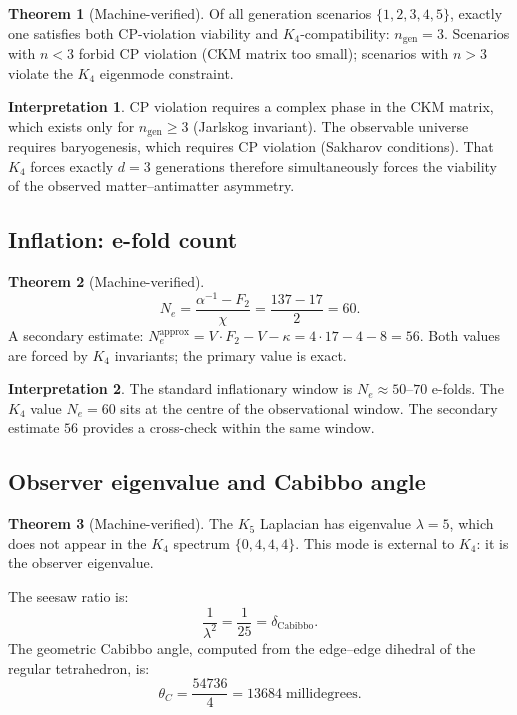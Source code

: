 \documentclass[11pt,a4paper]{article}
\theoremstyle{definition}
\newtheorem{theorem}{Theorem}[section]
\newtheorem*{interpretation}{Interpretation}
\begin{document}
\begin{theorem}[Machine-verified]
Of all generation scenarios $\{1, 2, 3, 4, 5\}$, exactly one satisfies
both CP-violation viability and $K_4$-compatibility: $n_{\mathrm{gen}} = 3$.
Scenarios with $n < 3$ forbid CP violation (CKM matrix too small);
scenarios with $n > 3$ violate the $K_4$ eigenmode constraint.
\end{theorem}

\begin{interpretation}
CP violation requires a complex phase in the CKM matrix, which exists only
for $n_{\mathrm{gen}} \ge 3$ (Jarlskog invariant).  The observable universe
requires baryogenesis, which requires CP violation (Sakharov conditions).
That $K_4$ forces exactly $d = 3$ generations therefore simultaneously
forces the viability of the observed matter--antimatter asymmetry.
\end{interpretation}

\subsection{Inflation: e-fold count}

\begin{theorem}[Machine-verified]
\[
  N_e = \frac{\alpha^{-1} - F_2}{\chi} = \frac{137 - 17}{2} = 60.
\]
A secondary estimate: $N_e^{\mathrm{approx}} = V \cdot F_2 - V - \kappa
= 4 \cdot 17 - 4 - 8 = 56$.
Both values are forced by $K_4$ invariants; the primary value is exact.
\end{theorem}

\begin{interpretation}
The standard inflationary window is $N_e \approx 50$--$70$ e-folds.
The $K_4$ value $N_e = 60$ sits at the centre of the observational window.
The secondary estimate $56$ provides a cross-check within the same window.
\end{interpretation}

\subsection{Observer eigenvalue and Cabibbo angle}

\begin{theorem}[Machine-verified]
The $K_5$ Laplacian has eigenvalue $\lambda = 5$, which does not appear in
the $K_4$ spectrum $\{0, 4, 4, 4\}$.  This mode is external to $K_4$:
it is the observer eigenvalue.

The seesaw ratio is:
\[
  \frac{1}{\lambda^2} = \frac{1}{25} = \delta_{\mathrm{Cabibbo}}.
\]
The geometric Cabibbo angle, computed from the edge--edge dihedral of the
regular tetrahedron, is:
\[
  \theta_C = \frac{54736}{4} = 13684 \;\text{millidegrees}.
\]
\end{theorem}
\end{document}
